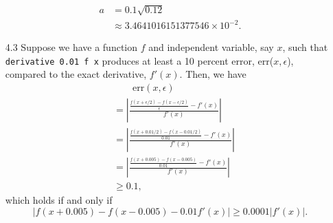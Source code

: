 \documentclass{article}
\begin{document}
\begin{itemize}
    \begin{equation*}
        \begin{split}
            a &= 0.1\sqrt{0.12} \\
            &\approx 3.4641016151377546 \times {10}^{-2}.
        \end{split}
    \end{equation*}
    \item[4.3]
    Suppose we have a function $f$ and independent variable, say $x$, such that 
    \verb|derivative 0.01 f x| produces at least a 10 percent error, err($x, \epsilon$), compared to 
    the exact derivative, $f'(x)$. Then, we have
    \begin{equation*}
        \begin{split}
            &\qquad \text{err}(x, \epsilon) \\ 
            &= \left| \frac{\frac{f(x + \epsilon/2) - f(x - \epsilon/2)}{\epsilon} - 
            f'(x)}{f'(x)} \right| \\
            &= \left| \frac{\frac{f(x + 0.01/2) - f(x - 0.01/2)}{0.01} - f'(x)}{f'(x)} \right| \\
            &= \left| \frac{\frac{f(x + 0.005) - f(x - 0.005)}{0.01} - f'(x)}{f'(x)} \right| \\
            &\geq 0.1,
        \end{split}
    \end{equation*}
    which holds if and only if
    \[
        \left| f(x + 0.005) - f(x - 0.005) - 0.01f'(x)\right|
        \geq 0.0001|f'(x)|.
    \]
\end{itemize}
\end{document}
